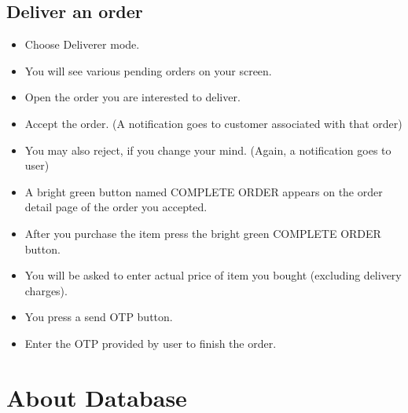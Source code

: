 \documentclass{report}
\begin{document}
\section{Deliver an order}
\begin{itemize}[label=$\rightarrow$]
\item Choose Deliverer mode.
\item You will see various pending orders on your screen.
\item Open the order you are interested to deliver.
\item Accept the order. (A notification goes to customer associated with that order)
\item You may also reject, if you change your mind. (Again, a notification goes to user)
\item A bright green button named COMPLETE ORDER appears on the order detail page of the order you accepted.
\item After you purchase the item press the bright green COMPLETE ORDER button.
\item You will be asked to enter actual price of item you bought (excluding delivery charges).
\item You press a send OTP button.
\item Enter the OTP provided by user to finish the order.

\end{itemize}

\chapter{About Database}

\end{document}
